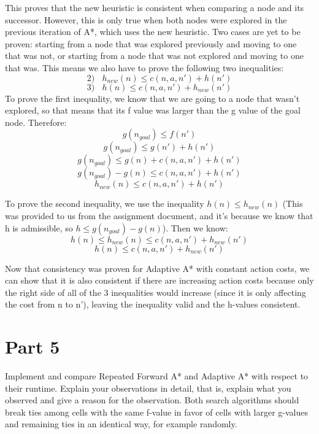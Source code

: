 \documentclass{article}
\begin{document}
{This proves that the new heuristic is consistent when comparing a node and its successor. However, this is only true when both nodes were explored in the previous iteration of A*, which uses the new heuristic. Two cases are yet to be proven: starting from a node that was explored previously and moving to one that was not, or starting from a node that was not explored and moving to one that was. This means we also have to prove the following two inequalities:
$$2) ~~~~h_{new}(n) \le c(n, a, n') + h(n')$$
$$3) ~~~~h(n) \le c(n, a, n') + h_{new}(n')$$
To prove the first inequality, we know that we are going to a node that wasn't explored, so that means that its f value was larger than the g value of the goal node. Therefore:
$$g(n_{goal}) \le f(n')$$
$$g(n_{goal}) \le g(n') + h(n')$$
$$g(n_{goal}) \le g(n) + c(n, a, n') + h(n')$$
$$g(n_{goal}) - g(n) \le c(n, a, n') + h(n')$$
$$h_{new}(n) \le c(n, a, n') + h(n')$$

To prove the second inequality, we use the inequality $h(n) \le h_{new}(n)$ (This was provided to us from the assignment document, and it's because we know that h is admissible, so $h \le g(n_{goal}) - g(n)$). Then we know:
$$h(n) \le h_{new}(n) \le c(n, a, n') + h_{new}(n') $$
$$h(n) \le c(n, a, n') + h_{new}(n') $$

Now that consistency was proven for Adaptive A* with constant action costs, we can show that it is also consistent if there are increasing action costs because only the right side of all of the 3 inequalities would increase (since it is only affecting the cost from n to n'), leaving the inequality valid and the h-values consistent. 


}

\newpage
\section*{Part 5}
Implement and compare Repeated Forward A* and Adaptive A* with respect to their runtime. Explain your observations in detail, that is, explain what you observed and give a reason for the observation. Both search algorithms should break ties among cells with the same f-value in favor of cells with larger g-values and remaining ties in an identical way, for example randomly.
\end{document}
